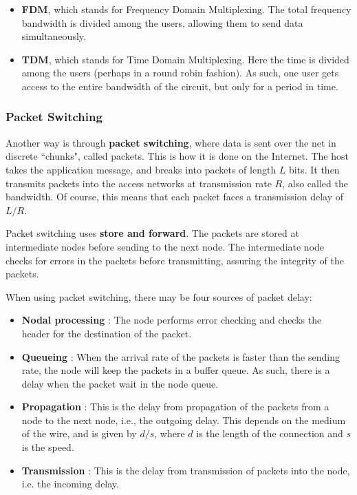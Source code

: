 \documentclass[12pt,letterpaper]{article}
\theoremstyle{definition}
\begin{document}
\begin{itemize}
  \item \textbf{FDM}, which stands for Frequency Domain Multiplexing. The total frequency bandwidth is divided among the users, allowing them to send data simultaneously. 
  \item \textbf{TDM}, which stands for Time Domain Multiplexing. Here the time is divided among the users (perhaps in a round robin fashion). As such, one user gets access to the entire bandwidth of the circuit, but only for a period in time.
\end{itemize}

\subsubsection{Packet Switching}

Another way is through \textbf{packet switching}, where data is sent over the net in discrete ``chunks", called packets. This is how it is done on the Internet. The host takes the application message, and breaks into packets of length $L$ bits. It then transmits packets into the access networks at transmission rate $R$, also called the bandwidth. Of course, this means that each packet faces a transmission delay of $L/R$.

Packet switching uses \textbf{store and forward}. The packets are stored at intermediate nodes before sending to the next node. The intermediate node checks for errors in the packets before transmitting, assuring the integrity of the packets.

When using packet switching, there may be four sources of packet delay:

\begin{itemize}
  \item \textbf{Nodal processing} : The node performs error checking and checks the header for the destination of the packet.
  \item \textbf{Queueing} : When the arrival rate of the packets is faster than the sending rate, the node will keep the packets in a buffer queue. As such, there is a delay when the packet wait in the node queue.
  \item \textbf{Propagation} : This is the delay from propagation of the packets from a node to the next node, i.e., the outgoing delay. This depends on the medium of the wire, and is given by $d/s$, where $d$ is the length of the connection and $s$ is the speed.
  \item \textbf{Transmission} : This is the delay from transmission of packets into the node, i.e. the incoming delay.
\end{itemize}
\end{document}
